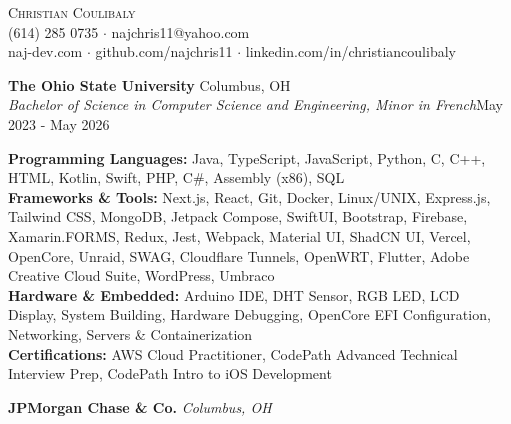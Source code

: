 \documentclass[letterpaper]{article}
\begin{document}
\vspace*{-40pt}

\vspace*{-10pt}
\begin{center}
	{\Huge \scshape {Christian Coulibaly}}\\
	(614) 285 0735 $\cdot$ najchris11@yahoo.com \\
    naj-dev.com $\cdot$ github.com/najchris11 $\cdot$ linkedin.com/in/christiancoulibaly\\
\end{center}

\vspace{1mm}

    \textbf{The Ohio State University} \hfill Columbus, OH\\
    \textit{Bachelor of Science in Computer Science and Engineering, Minor in French}\hfill May 2023 -  May 2026\\

    \vspace{2mm}


\vspace{1mm}

    \textbf{Programming Languages:} Java, TypeScript, JavaScript, Python, C, C++, HTML, Kotlin, Swift, PHP, C\#, Assembly (x86), SQL \\
    \textbf{Frameworks \& Tools:} Next.js, React, Git, Docker, Linux/UNIX, Express.js, Tailwind CSS, MongoDB, Jetpack Compose, SwiftUI, Bootstrap, Firebase, Xamarin.FORMS, Redux, Jest, Webpack, Material UI, ShadCN UI, Vercel, OpenCore, Unraid, SWAG, Cloudflare Tunnels, OpenWRT, Flutter, Adobe Creative Cloud Suite, WordPress, Umbraco \\
    \textbf{Hardware \& Embedded:} Arduino IDE, DHT Sensor, RGB LED, LCD Display, System Building, Hardware Debugging, OpenCore EFI Configuration, Networking, Servers \& Containerization \\
    \textbf{Certifications:} AWS Cloud Practitioner, CodePath Advanced Technical Interview Prep, CodePath Intro to iOS Development \\
\vspace{2mm}

\vspace{1mm}

    \textbf{JPMorgan Chase \& Co.} \hfill \textsl{Columbus, OH}\\
\end{document}
